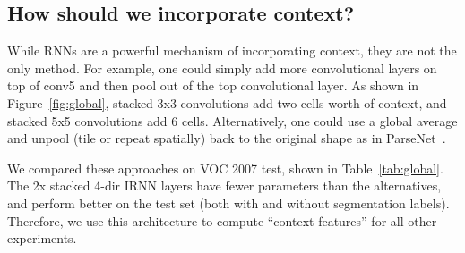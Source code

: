 \documentclass[10pt,twocolumn,letterpaper]{article}
\begin{document}
\subsection{How should we incorporate context?}

While RNNs are a powerful mechanism of incorporating context, they are not the only
method.  For example, one could simply add more convolutional layers on top of
conv5 and then pool out of the top convolutional layer.  As shown in
Figure~\ref{fig:global}, stacked 3x3 convolutions add two cells worth of
context, and stacked 5x5 convolutions add 6 cells.  Alternatively, one could
use a global average and unpool (tile or repeat spatially) back to the original
shape as in ParseNet~\cite{parsenet}.

We compared these approaches on VOC 2007 test, shown in Table~\ref{tab:global}.
The 2x stacked 4-dir IRNN layers have fewer parameters than the alternatives, and
perform better on the test set (both with and without segmentation labels).
Therefore, we use this architecture to compute ``context features'' for all
other experiments.
\end{document}
